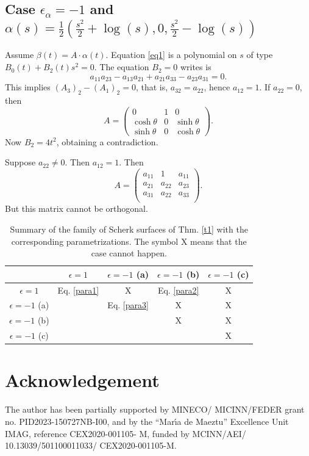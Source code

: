 \documentclass[a4paper,12pt]{amsart}
\numberwithin{equation}{section}
\theoremstyle{definition}
\begin{document}
\subsection{Case $\epsilon_\alpha=-1$ and $\alpha(s)=\frac12(\frac{s^2}{2}+\log(s),0,\frac{s^2}{2}-\log(s))$}

Assume  $\beta(t)=A\cdot\alpha(t)$.  Equation \eqref{eq1} is a polynomial on $s$ of type $B_0(t)+B_2(t)s^2=0$. The equation $B_2=0$ writes is
$$a_{11}a_{23}-a_{13}a_{21}+a_{21}a_{33}-a_{23}a_{31}=0.$$
This implies $(A_3)_2-(A_1)_2=0$, that is, $a_{32}=a_{22}$, hence $a_{12}=1$. If $a_{22}=0$, then 
\begin{equation}\label{a3}
A=\begin{pmatrix}0&1&0\\ \cosh\theta&0&\sinh\theta\\ \sinh\theta&0&\cosh\theta\end{pmatrix}.
\end{equation}
Now $B_2=4t^2$, obtaining a contradiction. 

Suppose $a_{22}\not=0$. Then $a_{12}=1$. Then 
$$A=\left(
\begin{array}{ccc}
 a_{11} & 1 &a_{11} \\
 a_{21}& a_{22} & a_{23}\\
a_{31}&a_{22} &a_{33}\\
\end{array}
\right).$$
But this matrix cannot be orthogonal.   
 
 
 
 \begin{table}[hbtp]
 \begin{tabular}{|c|c|c|c|c|}
\hline
\diagbox{$\alpha$}{$\beta$}  & $\epsilon=1$  & $\epsilon=-1$ (a) & $\epsilon=-1$ (b) & $\epsilon=-1$ (c) \\
\hline
$\epsilon=1$ &  Eq. \eqref{para1} & X & Eq. \eqref{para2}& X\\
\hline
$\epsilon=-1$ (a) &   & Eq. \eqref{para3} & X & X\\
\hline
$\epsilon=-1$ (b) &   &  &X & X \\
\hline
$\epsilon=-1$ (c)&   & &  & X\\
\hline
\end{tabular}
\caption{Summary of the family of Scherk surfaces of Thm. \ref{t1} with the corresponding parametrizations.   The symbol X means that the case cannot happen.}\label{table}
\end{table}

\section{Acknowledgement} The   author   has been partially supported by MINECO/ MICINN/FEDER grant no. PID2023-150727NB-I00, and by the ``Mar\'{\i}a de Maeztu'' Excellence Unit IMAG, reference CEX2020-001105- M, funded by MCINN/AEI/ 10.13039/501100011033/ CEX2020-001105-M.
\end{document}
